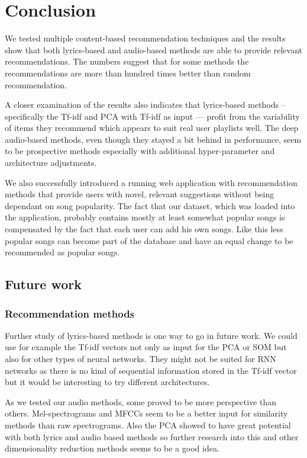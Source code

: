 \chapter*{Conclusion}
We tested multiple content-based recommendation techniques and the results show that both lyrics-based and audio-based methods are able to provide relevant recommendations. The numbers suggest that for some methods the recommendations are more than hundred times better than random recommendation. 

A closer examination of the results also indicates that lyrics-based methods -- specifically the Tf-idf and PCA with Tf-idf as input --- profit from the variability of items they recommend which appears to suit real user playlists well. The deep audio-based methods, even though they stayed a bit behind in performance, seem to be prospective methods especially with additional hyper-parameter and architecture adjustments. 

We also successfully introduced a running web application with recommendation methods that provide users with novel, relevant suggestions without being dependant on song popularity. The fact that our dataset, which was loaded into the application, probably contains mostly at least somewhat popular songs is compensated by the fact that each user can add his own songs. Like this less popular songs can become part of the database and have an equal change to be recommended as popular songs. 

\section*{Future work}
\subsection*{Recommendation methods}
Further study of lyrics-based methods is one way to go in future work. We could use for example the Tf-idf vectors not only as input for the PCA or SOM but also for other types of neural networks. They might not be suited for RNN networks as there is no kind of sequential information stored in the Tf-idf vector but it would be interesting to try different architectures.

As we tested our audio methods, some proved to be more perspective than others. Mel-spectrograms and MFCCs seem to be a better input for similarity methods than raw spectrograms. Also the PCA showed to have great potential with both lyrics and audio based methods so further research into this and other dimensionality reduction methods seems to be a good idea. 

